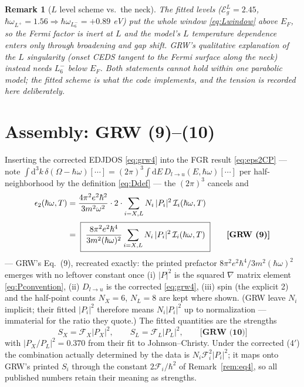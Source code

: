 \documentclass[11pt,a4paper]{article}
\numberwithin{equation}{section}
\newcommand{\hw}{\hbar\omega}
\newcommand{\EgL}{\mathcal{E}_g^{L}}
\newcommand{\cF}{\mathcal{F}}
\newcommand{\cI}{\mathcal{I}}
\newcommand{\dd}{\mathrm{d}}
\newcommand{\wLsix}{\hbar\omega_{L_6^-}}
\newcommand{\wLplus}{\hbar\omega_{L^+}}
\newcommand{\grweq}[1]{\textbf{[GRW~(#1)]}}
\newtheorem{remark}{Remark}[section]
\begin{document}
\begin{remark}[$L$ level scheme vs.\ the neck]
The fitted levels ($\EgL=2.45$, $\wLplus=1.56\Rightarrow\wLsix=+0.89$
eV) put the whole window \eqref{eq:Lwindow} above $E_F$, so the Fermi
factor is inert at $L$ and the model's $L$ temperature dependence
enters only through broadening and gap shift.  GRW's qualitative
explanation of the $L$ singularity (onset CEDS tangent to the Fermi
surface along the neck) instead needs $L_6^-$ \emph{below} $E_F$.
Both statements cannot hold within one parabolic model; the fitted
scheme is what the code implements, and the tension is recorded here
deliberately.
\end{remark}

\section{Assembly: GRW (9)--(10)}\label{sec:eps2}

Inserting the corrected EDJDOS \eqref{eq:grw4} into the FGR result
\eqref{eq:eps2CP} --- note
$\int\dd^3k\,\delta(\Omega-\hw)[\cdots]
=(2\pi)^3\!\int\!\dd E\,D_{l\to u}(E,\hw)[\cdots]$ per
half-neighborhood by the definition \eqref{eq:Ddef} --- the $(2\pi)^3$
cancels and
\begin{align}
\epsilon_2(\hw,T)
&=\frac{4\pi^2e^2\hbar^2}{3m^2\omega^2}\cdot2\cdot
\sum_{i=X,L}N_i\,|P_i|^2\,\cI_i(\hw,T)
\notag\\[2pt]
&=\;
\boxed{\;
\frac{8\pi^2e^2\hbar^4}{3m^2(\hw)^2}
\sum_{i=X,L}N_i\,|P_i|^2\,\cI_i(\hw,T)
\;}\qquad\grweq{9}
\label{eq:grw9}
\end{align}
--- GRW's Eq.~(9), recreated exactly: the printed prefactor
$8\pi^2e^2\hbar^4/3m^2(\hw)^2$ emerges with no leftover constant once
(i) $|P|^2$ is the squared $\nabla$ matrix element
\eqref{eq:Pconvention}, (ii) $D_{l\to u}$ is the corrected
\eqref{eq:grw4}, (iii) spin (the explicit 2) and the half-point
counts $N_X=6$, $N_L=8$ are kept where shown.  (GRW leave $N_i$
implicit; their fitted $|P_i|^2$ therefore means $N_i|P_i|^2$ up to
normalization --- immaterial for the ratio they quote.)  The fitted
quantities are the strengths
\begin{equation}
S_X=\cF_X|P_X|^2,\qquad S_L=\cF_L|P_L|^2,
\qquad\grweq{10}
\label{eq:grw10}
\end{equation}
with $|P_X/P_L|^2=0.370$ from their fit to Johnson--Christy.  Under
the corrected (4$'$) the combination actually determined by the data
is $N_i\cF_i^2|P_i|^2$; it maps onto GRW's printed $S_i$ through the
constant $2\cF_i/\hbar^2$ of Remark~\ref{rem:eq4}, so all published
numbers retain their meaning as strengths.
\end{document}

